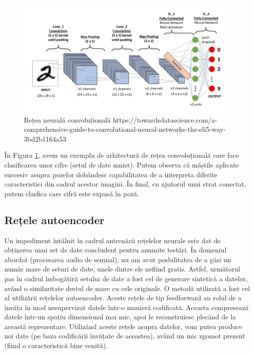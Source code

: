 \documentclass[a4paper,12pt]{report}
\begin{document}
	 \begin{figure}[H]
		\begin{center}
			\includegraphics[scale=0.7]{images/cnn.PNG}
		\end{center}
		\caption{Rețea neurală convoluțională \newline
			\hspace{\linewidth}https://towardsdatascience.com/a-comprehensive-guide-to-convolutional-neural-networks-the-eli5-way-3bd2b1164a53}
		\label{fig:cnn}
	\end{figure}

	În Figura \ref{fig:cnn}, avem un exemplu de arhitectură de rețea convoluțională care face clasificarea unor cifre (setul de date mnist). Putem observa că măștile aplicate succesiv asupra pozelor dobândesc capabilitatea de a interpreta diferite caracteristici din cadrul acestor imagini. În final, cu ajutorul unui strat conectat, putem clasfica care cifră este expusă în poză.
    
    \clearpage
    \subsection{Rețele autoencoder}
    Un impediment întâlnit în cadrul antrenării rețelelor neurale este dat de obținerea unui set de date concludent pentru anumite testări. În domeniul abordat (procesarea audio de semnal), nu am avut posbilitatea de a găsi un număr mare de seturi de date, unele dintre ele nefiind gratis. Astfel, următorul pas în cadrul îmbogățirii setului de date a fost cel de generare sintetică a datelor, având o similaritate destul de mare cu cele originale. O metodă utilizată a fost cel al utilizării rețelelor autoencoder. Aceste rețele de tip feedforward au rolul de a învăța în mod nesupervizat datele într-o manieră codificată. Aceasta compresează datele într-un spațiu dimensional mai mic, apoi le reconstruiesc plecând de la această reprezentare. Utilizând aceste rețele asupra datelor, vom putea produce noi date (pe baza codificării învățate de aceastea), având un mic zgomot prezent (fiind o caracteristică bine venită). 
    
\end{document}
